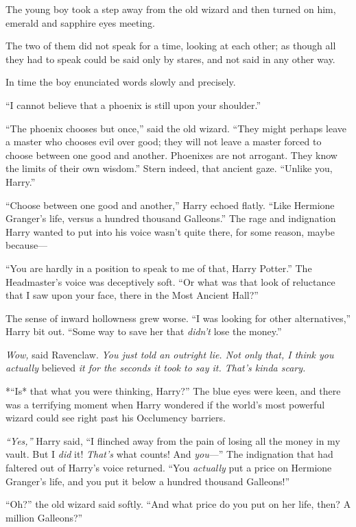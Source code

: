 The young boy took a step away from the old wizard and then turned on
him, emerald and sapphire eyes meeting.

The two of them did not speak for a time, looking at each other; as
though all they had to speak could be said only by stares, and not said
in any other way.

In time the boy enunciated words slowly and precisely.

``I cannot believe that a phoenix is still upon your shoulder.''

``The phoenix chooses but once,'' said the old wizard. ``They might
perhaps leave a master who chooses evil over good; they will not leave a
master forced to choose between one good and another. Phoenixes are not
arrogant. They know the limits of their own wisdom.'' Stern indeed, that
ancient gaze. ``Unlike you, Harry.''

``Choose between one good and another,'' Harry echoed flatly. ``Like
Hermione Granger's life, versus a hundred thousand Galleons.'' The rage
and indignation Harry wanted to put into his voice wasn't quite there,
for some reason, maybe because---

``You are hardly in a position to speak to me of that, Harry Potter.''
The Headmaster's voice was deceptively soft. ``Or what was that look of
reluctance that I saw upon your face, there in the Most Ancient Hall?''

The sense of inward hollowness grew worse. ``I was looking for other
alternatives,'' Harry bit out. ``Some way to save her that \emph{didn't}
lose the money.''

\emph{Wow,} said Ravenclaw. \emph{You just told an outright lie. Not
only that, I think you actually} believed \emph{it for the seconds it
took to say it. That's kinda scary.}

*``Is* that what you were thinking, Harry?'' The blue eyes were keen,
and there was a terrifying moment when Harry wondered if the world's
most powerful wizard could see right past his Occlumency barriers.

\emph{``Yes,''} Harry said, ``I flinched away from the pain of losing
all the money in my vault. But I \emph{did} it! \emph{That's} what
counts! And \emph{you}---'' The indignation that had faltered out of
Harry's voice returned. ``You \emph{actually} put a price on Hermione
Granger's life, and you put it below a hundred thousand Galleons!''

``Oh?'' the old wizard said softly. ``And what price do you put on her
life, then? A million Galleons?''

